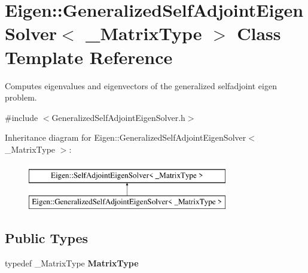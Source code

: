 \hypertarget{class_eigen_1_1_generalized_self_adjoint_eigen_solver}{}\section{Eigen\+::Generalized\+Self\+Adjoint\+Eigen\+Solver$<$ \+\_\+\+Matrix\+Type $>$ Class Template Reference}
\label{class_eigen_1_1_generalized_self_adjoint_eigen_solver}


Computes eigenvalues and eigenvectors of the generalized selfadjoint eigen problem.  




{\ttfamily \#include $<$Generalized\+Self\+Adjoint\+Eigen\+Solver.\+h$>$}

Inheritance diagram for Eigen\+::Generalized\+Self\+Adjoint\+Eigen\+Solver$<$ \+\_\+\+Matrix\+Type $>$\+:\begin{figure}[H]
\begin{center}
\leavevmode
\includegraphics[height=2.000000cm]{class_eigen_1_1_generalized_self_adjoint_eigen_solver}
\end{center}
\end{figure}
\subsection*{Public Types}
\begin{DoxyCompactItemize}
\item 
\mbox{\label{class_eigen_1_1_generalized_self_adjoint_eigen_solver_a8e85caf68c29edc0693fad978d0dff7d}} 
typedef \+\_\+\+Matrix\+Type {\bfseries Matrix\+Type}
\end{DoxyCompactItemize}
